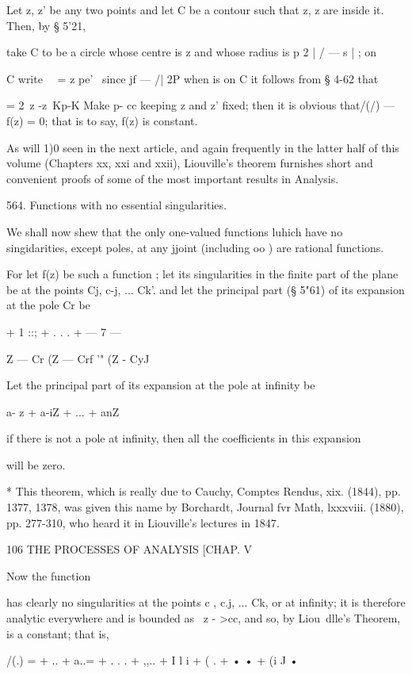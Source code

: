 {{{{Let z, z' be any two points and let C be a contour such that z, z are 
inside it. Then, by § 5'21, 

take C to be a circle whose centre is z and whose radius is p   2 | / — s | ; on 

C write \ \  = z    pe'  \ since jf — /| 2P when   is on C it follows from § 4-62 
that 

= 2\ z -z\ Kp-K 
Make p-  cc   keeping z and z' fixed; then it is obvious that/(/) —f(z) = 0; 
that is to say, f(z) is constant. 

As will 1)0 seen in the next article, and again frequently in the latter half of this 
volume (Chapters xx, xxi and xxii), Liouville's theorem furnishes short and convenient 
proofs of some of the most important results in Analysis. 

564. Functions with no essential singularities. 

We shall now shew that the only one-valued functions luhich have no 
singidarities, except poles, at any jjoint (including oo ) are rational functions. 

For let f(z) be such a function ; let its singularities in the finite part 
of the plane be at the points Cj, c-j, ... Ck'. and let the principal part (§ 5"61) 
of its expansion at the pole Cr be 

+ 1 ::; + . . . + — 7 — 



Z — Cr (Z — Crf '" (Z - CyJ  

Let the principal part of its expansion at the pole at infinity be 

a- z + a-iZ  + ... + anZ \ 

if there is not a pole at infinity, then all the coefficients in this expansion 

will be zero. 

* This theorem, which is really due to Cauchy, Comptes Rendus, xix. (1844), pp. 1377, 1378, 
was given this name by Borchardt, Journal fvr Math, lxxxviii. (1880), pp. 277-310, who heard it 
in Liouville's lectures in 1847. 



106 THE PROCESSES OF ANALYSIS [CHAP. V 

Now the function 

has clearly no singularities at the points c  , c.j, ... Ck, or at infinity; it is 
therefore analytic everywhere and is bounded as \ z - >cc, and so, by 
Liou\ dlle's Theorem, is a constant; that is, 

/(.) = +  .. + a..= + . . . + ,,..  + I l i + ( . + •   • + (i J • 

}}}}

